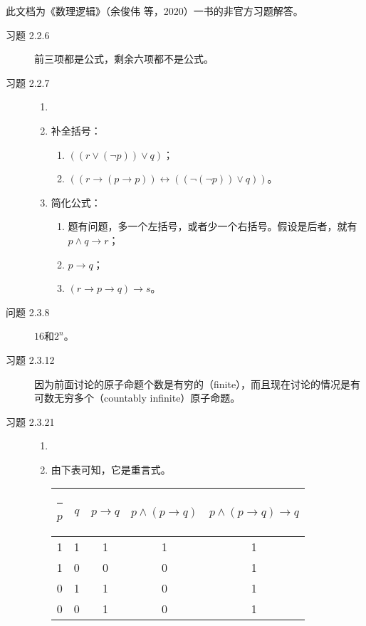 \documentclass[punct=custom/kaiming,fontset=none]{ctexart}
\title{\Large\bfseries\titleContent}
\title{\bfseries\titleContent}
\author{\authorContent}
\makeatletter
\def\hhline{%
  \noalign{\ifnum0=`}\fi\hrule \@height 2\arrayrulewidth \futurelet
   \reserved@a\@xhline}
\theoremstyle{remark}
\makeatother
\begin{document}
\maketitle

此文档为《数理逻辑》（余俊伟 等，2020）一书的非官方习题解答。

\begin{description}
\item[习题 2.2.6] 前三项都是公式，剩余六项都不是公式。
\item[习题 2.2.7]
  \begin{enumerate}
  \item[]
  \item 补全括号：
    \begin{enumerate}
    \item \(((r \vee (\neg p)) \vee q)\)；
    \item \(((r \to (p \to p)) \leftrightarrow ((\neg(\neg p)) \vee q))\)。
    \end{enumerate}
  \item 简化公式：
    \begin{enumerate}
    \item 题有问题，多一个左括号，或者少一个右括号。假设是后者，就有\(p \wedge q \to r\)；
    \item \(p \to q\)；
    \item \((r \to p \to q) \to s\)。
    \end{enumerate}
  \end{enumerate}
\item[问题 2.3.8] \(16\)和\(2^n\)。
\item[习题 2.3.12] 因为前面讨论的原子命题个数是有穷的（finite），而且现在讨论的情况是有可数无穷多个（countably infinite）原子命题。
\item[习题 2.3.21]
  \begin{enumerate}
  \item[]
  \item 由下表可知，它是重言式。
    \begin{table}[H]
      \centering
      \begin{tabular}[t]{ccccc}
        \hhline
        \(p\) & \(q\) & \(p \to q\) & \(p \land (p \to q)\) & \(p \land (p \to q) \to q\) \\
        \hline
        1 & 1 & 1 & 1 & 1 \\
        1 & 0 & 0 & 0 & 1 \\
        0 & 1 & 1 & 0 & 1 \\
        0 & 0 & 1 & 0 & 1 \\

\end{tabular}
\end{table}
\end{enumerate}
\end{description}
\end{document}
